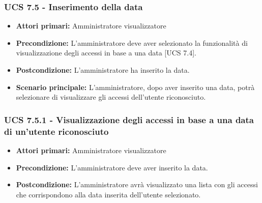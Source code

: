 \subsubsection{UCS 7.5 - Inserimento della data }
\begin{itemize}
	\item \textbf{Attori primari:} Amministratore visualizzatore
	\item \textbf{Precondizione:} L'amministratore deve aver selezionato la funzionalità di visualizzazione degli accessi in base a una data [UCS 7.4].
	\item \textbf{Postcondizione:} L'amministratore ha inserito la data.
	\item \textbf{Scenario principale:} L'amministratore, dopo aver inserito una data, potrà selezionare di visualizzare gli accessi dell'utente riconosciuto.
\end{itemize}

\subsubsection{UCS 7.5.1 - Visualizzazione degli accessi in base a una data di un'utente riconosciuto }
\begin{itemize}
	\item \textbf{Attori primari:} Amministratore visualizzatore
	\item \textbf{Precondizione:} L'amministratore deve aver inserito la data.
	\item \textbf{Postcondizione:} L'amministratore avrà visualizzato una lista con gli accessi che corrispondono alla data inserita dell'utente selezionato.
\end{itemize}


